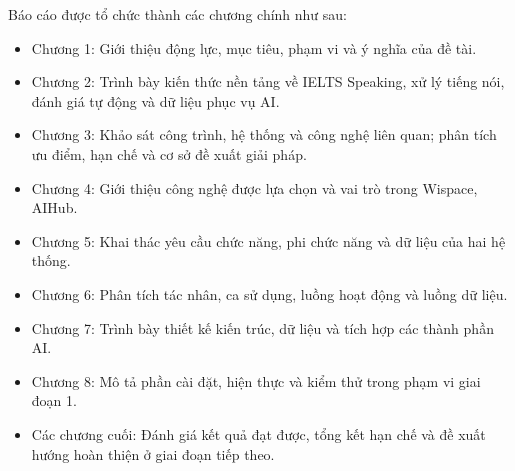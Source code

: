 \indent Báo cáo được tổ chức thành các chương chính như sau:
\begin{itemize}
    \item Chương 1: Giới thiệu động lực, mục tiêu, phạm vi và ý nghĩa của đề tài.
    \item Chương 2: Trình bày kiến thức nền tảng về IELTS Speaking, xử lý tiếng nói, đánh giá tự động và dữ liệu phục vụ AI.
    \item Chương 3: Khảo sát công trình, hệ thống và công nghệ liên quan; phân tích ưu điểm, hạn chế và cơ sở đề xuất giải pháp.
    \item Chương 4: Giới thiệu công nghệ được lựa chọn và vai trò trong Wispace, AIHub.
    \item Chương 5: Khai thác yêu cầu chức năng, phi chức năng và dữ liệu của hai hệ thống.
    \item Chương 6: Phân tích tác nhân, ca sử dụng, luồng hoạt động và luồng dữ liệu.
    \item Chương 7: Trình bày thiết kế kiến trúc, dữ liệu và tích hợp các thành phần AI.
    \item Chương 8: Mô tả phần cài đặt, hiện thực và kiểm thử trong phạm vi giai đoạn 1.
    \item Các chương cuối: Đánh giá kết quả đạt được, tổng kết hạn chế và đề xuất hướng hoàn thiện ở giai đoạn tiếp theo.
\end{itemize}
